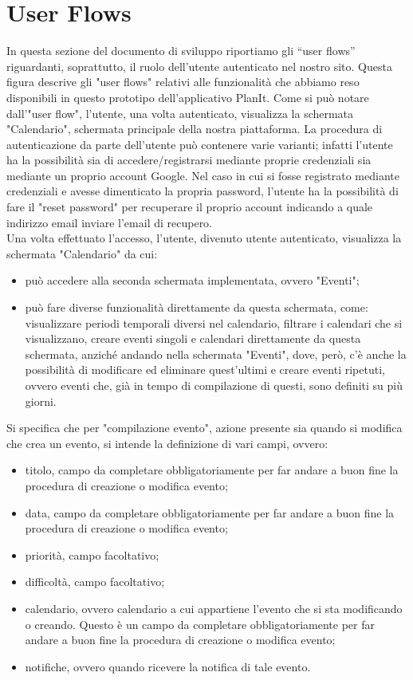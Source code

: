 \section{User Flows}
\label{secD4:UserFlows}

In questa sezione del documento di sviluppo riportiamo gli “user flows” riguardanti, soprattutto, il ruolo dell'utente autenticato nel nostro sito.
Questa figura descrive gli "user flows" relativi alle funzionalità che abbiamo reso disponibili in questo prototipo dell'applicativo PlanIt. Come si può notare dall'"user flow", l'utente, una volta autenticato, visualizza la schermata "Calendario", schermata principale della nostra piattaforma. La procedura di autenticazione da parte dell'utente può contenere varie varianti; infatti l'utente ha la possibilità sia di accedere/registrarsi mediante proprie credenziali sia mediante un proprio account Google. Nel caso in cui si fosse registrato mediante credenziali e avesse dimenticato la propria password, l'utente ha la possibilità di fare il "reset password" per recuperare il proprio account indicando a quale indirizzo email inviare l'email di recupero. \\
Una volta effettuato l'accesso, l'utente, divenuto utente autenticato, visualizza la schermata "Calendario" da cui:
\begin{itemize}
    \item può accedere alla seconda schermata implementata, ovvero "Eventi";
    \item può fare diverse funzionalità direttamente da questa schermata, come: visualizzare periodi temporali diversi nel calendario, filtrare i calendari che si visualizzano, creare eventi singoli e calendari direttamente da questa schermata, anziché andando nella schermata "Eventi", dove, però, c'è anche la possibilità di modificare ed eliminare quest'ultimi e creare eventi ripetuti, ovvero eventi che, già in tempo di compilazione di questi, sono definiti su più giorni.
\end{itemize}
Si specifica che per "compilazione evento", azione presente sia quando si modifica che crea un evento, si intende la definizione di vari campi, ovvero:
\begin{itemize}
    \item titolo, campo da completare obbligatoriamente per far andare a buon fine la procedura di creazione o modifica evento;
    \item data, campo da completare obbligatoriamente per far andare a buon fine la procedura di creazione o modifica evento;
    \item priorità, campo facoltativo;
    \item difficoltà, campo facoltativo;
    \item calendario, ovvero calendario a cui appartiene l'evento che si sta modificando o creando. Questo è un campo da completare obbligatoriamente per far andare a buon fine la procedura di creazione o modifica evento;
    \item notifiche, ovvero quando ricevere la notifica di tale evento.
\end{itemize}
